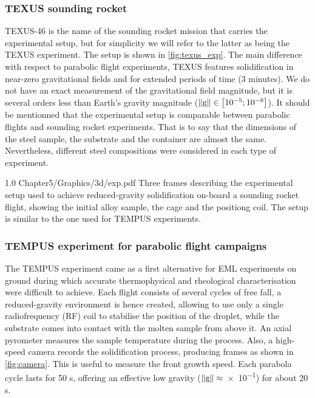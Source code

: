 \subsubsection{TEXUS sounding rocket}

TEXUS-46 is the name of the sounding rocket mission that carries the experimental setup, 
but for simplicity we will refer to the latter as being the TEXUS experiment. The setup is shown in \cref{fig:texus_exp}.
The main difference with respect to parabolic flight experiments,
TEXUS features solidification in near-zero gravitational fields and for extended periods of time (3 minutes). 
We do not have an exact measurement of the gravitational field magnitude, but it is several orders
less than Earth's gravity magnitude ($\lVert \boldsymbol{\text{g}} \rVert \in \left[ 10^{-5};10^{-8} \right]$\si{\uacceleration}).
It should be mentionned that the experimental setup is comparable between parabolic flights and sounding rocket experiments. That is to say
that the dimensions of the steel sample, the substrate and the container are almost the same. Nevertheless, different steel compositions were
considered in each type of experiment.

\begin{figureth}
{1.0}
{Chapter5/Graphics/3d/exp.pdf}
{Three frames describing the experimental setup used to achieve reduced-gravity 
solidification on-board a sounding rocket flight,
showing the initial alloy sample, the cage and the positiong coil. The setup
is similar to the one used for TEMPUS experiments.}
\label{fig:texus_exp}
\end{figureth}


\subsubsection{TEMPUS experiment for parabolic flight campaigns}

The TEMPUS experiment came as a first alternative for EML experiments on ground during which accurate thermophysical and rheological characterisation were difficult to achieve.
Each flight consists of several cycles of free fall, a reduced-gravity environment is hence created, 
allowing to use only a single radiofrequency (RF) coil to stabilise the position of the droplet, while the substrate comes into contact with the molten sample
from above it. An axial pyrometer measures the sample temperature during the process. 
Also, a high-speed camera records the solidification process, producing frames as shown in \cref{fig:camera}.
This is useful to measure the front growth speed. 
Each parabola cycle lasts for 50 s, offering an effective low gravity ($\lVert \boldsymbol{\text{g}} \rVert\approx$\SI{e-1}{\uacceleration}) for about 20 s.


